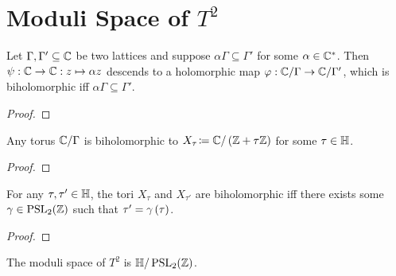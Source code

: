 \documentclass[../Moduli_Spaces_of_Riemann_Surfaces.tex]{subfiles}
\begin{document}
    \section{Moduli Space of $T^2$}
    \begin{lemma}
        Let $\Gamma,\Gamma'\subseteq\mathbb{C}$ be two lattices and suppose $\alpha\Gamma\subseteq\Gamma'$ for some $\alpha\in\mathbb{C}^\ast$. Then $\psi:\mathbb{C}\to\mathbb{C}:z\mapsto\alpha z$ descends to a holomorphic map $\varphi:\mathbb{C}/\Gamma\to\mathbb{C}/\Gamma'$, which is biholomorphic iff $\alpha\Gamma\subseteq\Gamma'$.
    \end{lemma}
    \begin{proof}
        
    \end{proof}
    \begin{lemma}
        Any torus $\mathbb{C}/\Gamma$ is biholomorphic to $X_\tau\!\coloneqq\mathbb{C}/\left(\mathbb{Z}+\tau\mathbb{Z}\right)$ for some $\tau\in\mathbb{H}$.
    \end{lemma}
    \begin{proof}
        
    \end{proof}
    \begin{lemma}
        For any $\tau,\tau'\in\mathbb{H}$, the tori $X_{\tau}$ and $X_{\tau'}$ are biholomorphic iff there exists some $\gamma\in\operatorname{PSL}_{2}\!\left(\mathbb{Z}\right)$ such that $\tau'=\gamma\left(\tau\right)$.
    \end{lemma}
    \begin{proof}
        
    \end{proof}
    \begin{theorem}
        The moduli space of $T^2$ is $\mathbb{H}/\operatorname{PSL}_{2}\!\left(\mathbb{Z}\right)$.
    \end{theorem}
\end{document}
